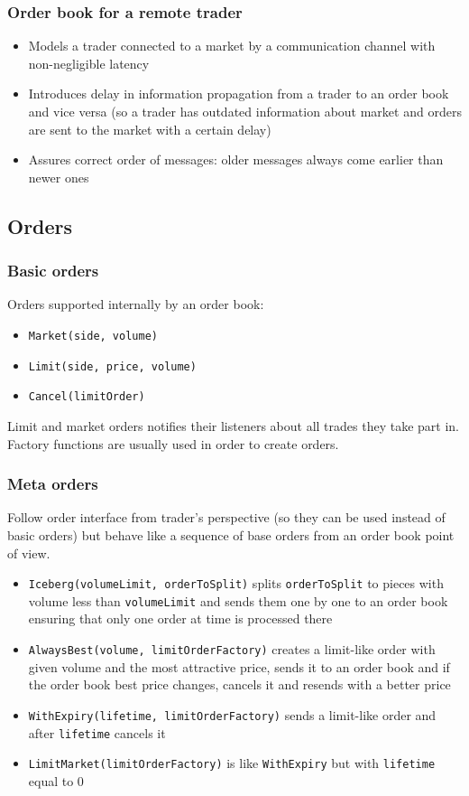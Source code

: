 \documentclass{beamer}
\begin{document}
\begin{frame}
\frametitle{Order book for a remote trader}
\begin{itemize}
  \item Models a trader connected to a market by a communication channel with non-negligible latency
  \item Introduces delay in information propagation from a trader to an order book and vice versa (so a trader has outdated information about market and orders are sent to the market with a certain delay)
  \item Assures correct order of messages: older messages always come earlier than newer ones
\end{itemize}
\end{frame}

\subsection{Orders}
\begin{frame}
\frametitle{Basic orders}
Orders supported internally by an order book:
\begin{itemize}
  \item \texttt{Market(side, volume)}
  \item \texttt{Limit(side, price, volume)}
  \item \texttt{Cancel(limitOrder)}
\end{itemize}
Limit and market orders notifies their listeners about all trades they take part in.
Factory functions are usually used in order to create orders.
\end{frame}

\begin{frame}
\frametitle{Meta orders}
Follow order interface from trader's perspective (so they can be used instead of basic orders) but behave like a sequence of base orders from an order book point of view.
\begin{itemize}
  \item \texttt{Iceberg(volumeLimit, orderToSplit)} splits \texttt{orderToSplit} to pieces with volume less than \texttt{volumeLimit} and sends them one by one to an order book ensuring that only one order at time is processed there
  \item \texttt{AlwaysBest(volume, limitOrderFactory)} creates a limit-like order with given volume and the most attractive price, sends it to an order book and if the order book best price changes, cancels it and resends with a better price
  \item \texttt{WithExpiry(lifetime, limitOrderFactory)} sends a limit-like order and after \texttt{lifetime} cancels it
  \item \texttt{LimitMarket(limitOrderFactory)} is like \texttt{WithExpiry} but with \texttt{lifetime} equal to 0
\end{itemize}
\end{frame}
\end{document}
